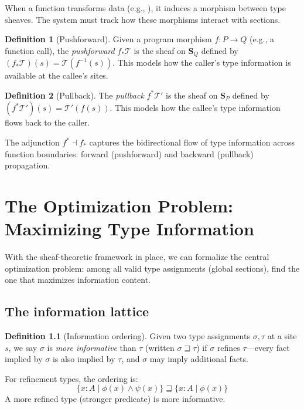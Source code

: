 \documentclass[11pt]{report}
\DeclareRobustCommand{\py}[1]{\texttt{\detokenize{#1}}}
\theoremstyle{definition}
\newtheorem{definition}{Definition}[section]
\theoremstyle{plain}
\begin{document}
When a function transforms data (e.g., \py{torch.reshape}), it induces a
morphism between type sheaves. The system must track how these morphisms
interact with sections.

\begin{definition}[Pushforward]
Given a program morphism $f : P \to Q$ (e.g., a function call), the
\emph{pushforward} $f_* \mathcal{T}$ is the sheaf on $\mathbf{S}_Q$ defined
by $(f_* \mathcal{T})(s) = \mathcal{T}(f^{-1}(s))$. This models how the
caller's type information is available at the callee's sites.
\end{definition}

\begin{definition}[Pullback]
The \emph{pullback} $f^* \mathcal{T}'$ is the sheaf on $\mathbf{S}_P$
defined by $(f^* \mathcal{T}')(s) = \mathcal{T}'(f(s))$. This models how the
callee's type information flows back to the caller.
\end{definition}

The adjunction $f^* \dashv f_*$ captures the bidirectional flow of type
information across function boundaries: forward (pushforward) and backward
(pullback) propagation.


\chapter{The Optimization Problem: Maximizing Type Information}

With the sheaf-theoretic framework in place, we can formalize the central
optimization problem: among all valid type assignments (global sections),
find the one that maximizes information content.

\section{The information lattice}

\begin{definition}[Information ordering]
Given two type assignments $\sigma, \tau$ at a site $s$, we say $\sigma$ is
\emph{more informative} than $\tau$ (written $\sigma \sqsupseteq \tau$) if
$\sigma$ refines $\tau$---every fact implied by $\sigma$ is also implied by
$\tau$, and $\sigma$ may imply additional facts.
\end{definition}

For refinement types, the ordering is:
\[
  \{x : A \mid \phi(x) \wedge \psi(x)\} \sqsupseteq \{x : A \mid \phi(x)\}
\]
A more refined type (stronger predicate) is more informative.
\end{document}

